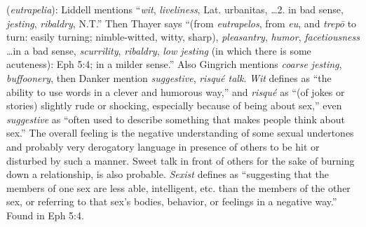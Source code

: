 \item[Sexist speech,]

(\textit{eutrapelia}):
Liddell mentions ``\emph{wit}, \emph{liveliness}, Lat. urbanitas, \ldots 2. in bad sense, \emph{jesting}, \emph{ribaldry}, N.T.'' Then Thayer says ``(from \emph{eutrapelos}, from \emph{eu}, and \emph{trepō} to turn: easily turning; nimble-witted, witty, sharp), \emph{pleasantry}, \emph{humor}, \emph{facetiousness} \ldots in a bad sense, \emph{scurrility}, \emph{ribaldry}, \emph{low jesting} (in which there is some acuteness): Eph 5:4; in a milder sense.'' Also Gingrich mentions \emph{coarse jesting}, \emph{buffoonery}, then Danker mention \emph{suggestive}, \emph{risqué talk}. \emph{Wit} defines as ``the ability to use words in a clever and humorous way,'' and \emph{risqué} as ``(of jokes or stories) slightly rude or shocking, especially because of being about sex,'' even \emph{suggestive} as ``often used to describe something that makes people think about sex.'' The overall feeling is the negative understanding of some sexual undertones and probably very derogatory language in presence of others to be hit or disturbed by such a manner. Sweet talk in front of others for the sake of burning down a relationship, is also probable. \emph{Sexist} defines as ``suggesting that the members of one sex are less able, intelligent, etc. than the members of the other sex, or referring to that sex's bodies, behavior, or feelings in a negative way.''
Found in Eph 5:4.
